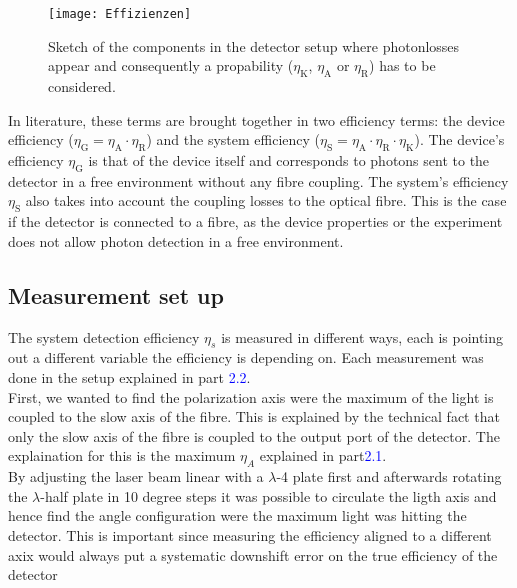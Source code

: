 \begin{figure}[hhh]
\texttt{[image: Effizienzen]}
\caption{Sketch of the components in the detector setup where photonlosses appear and consequently a propability
 ($\eta_{\text{K}}$, $\eta_{\text{A}}$ or $\eta_{\text{R}}$) has to be considered.}
\label{fig: single_efficiency_terms}
\end{figure}

In literature, these terms are brought together in two efficiency terms: the device efficiency
($\eta_{\text{G}} = \eta_{\text{A}} \cdot \eta_{\text{R}}$) and the system efficiency
($\eta_{\text{S}} = \eta_{\text{A}} \cdot \eta_{\text{R}} \cdot \eta_{\text{K}}$).
The device's efficiency $\eta_{\text{G}}$ is that of the device itself and corresponds to photons sent
to the detector in a free environment without any fibre coupling.
The system's efficiency $\eta_{\text{S}}$ also takes into account the coupling losses to the optical fibre.
This is the case if the detector is connected to a fibre, as the device properties or the experiment does not allow
photon detection in a free environment.\\

\subsection*{Measurement set up}

The system detection efficiency $\eta_{s}$ is measured in different ways, each is pointing out a different variable
the efficiency is depending on. Each measurement was done in the setup explained in part \textcolor{blue}{2.2}.
\\

First, we wanted to find the polarization axis were the maximum of the light is coupled to the slow axis of the fibre.
This is explained by the technical fact that only the slow axis of the fibre is coupled to the output port of the
detector. The explaination for this is the maximum $\eta_{A}$ explained in part\textcolor{blue}{2.1}.\\
By adjusting the laser beam linear with a $\lambda$-4 plate first and afterwards rotating the $\lambda$-half plate
in 10 degree steps it was possible to circulate the ligth axis and hence find the angle configuration were the maximum
light was hitting the detector.
This is important since measuring the efficiency aligned to a different axix would always
put a systematic downshift error on the true efficiency of the detector\\

